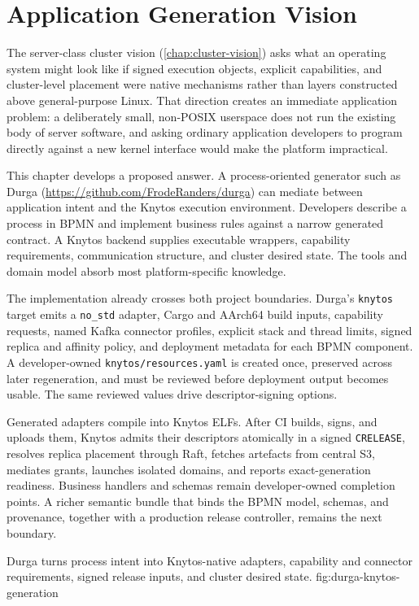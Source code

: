 \chapter{Application Generation Vision}
\label{chap:application-vision}

The server-class cluster vision (\autoref{chap:cluster-vision}) asks what an operating system
might look like if signed execution objects, explicit capabilities, and
cluster-level placement were native mechanisms rather than layers constructed
above general-purpose Linux. That direction creates an immediate application
problem: a deliberately small, non-POSIX userspace does not run the existing
body of server software, and asking ordinary application developers to program
directly against a new kernel interface would make the platform impractical.

This chapter develops a proposed answer. A process-oriented generator such as
Durga (\url{https://github.com/FrodeRanders/durga}) can mediate between
application intent and the Knytos execution environment. Developers describe
a process in BPMN and implement business rules against a narrow generated
contract. A Knytos backend supplies executable wrappers, capability
requirements, communication structure, and cluster desired state. The tools and
domain model absorb most platform-specific knowledge.

The implementation already crosses both project boundaries. Durga's
\texttt{knytos} target emits a \texttt{no\_std} adapter, Cargo and AArch64
build inputs, capability requests, named Kafka connector profiles, explicit
stack and thread limits, signed replica and affinity policy, and deployment
metadata for each BPMN component. A developer-owned
\texttt{knytos/resources.yaml} is created once, preserved across later
regeneration, and must be reviewed before deployment output becomes usable. The
same reviewed values drive descriptor-signing options.

Generated adapters compile into Knytos ELFs. After CI builds, signs, and
uploads them, Knytos admits their descriptors atomically in a signed
\texttt{CRELEASE}, resolves replica placement through Raft, fetches artefacts
from central S3, mediates grants, launches isolated domains, and reports
exact-generation readiness. Business handlers and schemas remain
developer-owned completion points. A richer semantic bundle that binds the BPMN
model, schemas, and provenance, together with a production release controller,
remains the next boundary.

    {Durga turns process intent into Knytos-native adapters, capability and
    connector requirements, signed release inputs, and cluster desired state.}
    {fig:durga-knytos-generation}


